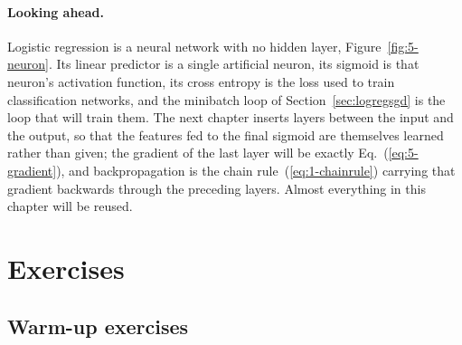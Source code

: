 \paragraph{Looking ahead.}
Logistic regression is a neural network with no hidden layer,
Figure~\ref{fig:5-neuron}.  Its linear predictor is a single artificial
neuron, its sigmoid is that neuron's activation function, its cross entropy
is the loss used to train classification networks, and the minibatch loop
of Section~\ref{sec:logregsgd} is the loop that will train them.  The next chapter inserts layers between the input and
the output, so that the features fed to the final sigmoid are themselves
learned rather than given; the gradient of the last layer will be exactly
Eq.~(\ref{eq:5-gradient}), and backpropagation is the chain
rule~(\ref{eq:1-chainrule}) carrying that gradient backwards through the
preceding layers.  Almost everything in this chapter will be reused.

\section{Exercises}
\label{sec:ch5exercises}

\subsection*{Warm-up exercises}

